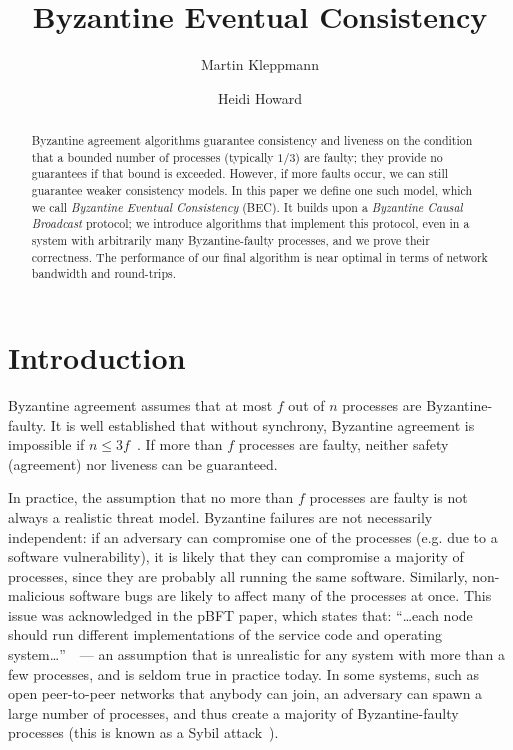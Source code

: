 \documentclass[a4paper,anonymous,USenglish]{lipics-v2019}
\title{Byzantine Eventual Consistency}
\author{Martin Kleppmann}{University of Cambridge}{mk428@cst.cam.ac.uk}{https://orcid.org/0000-0001-7252-6958}{Supported by a Leverhulme Trust Early Career Fellowship and by the Isaac Newton Trust.}
\author{Heidi Howard}{University of Cambridge}{hh360@cst.cam.ac.uk}{https://orcid.org/0000-0001-5256-7664}{}
\begin{document}
\maketitle
\begin{abstract}
    Byzantine agreement algorithms guarantee consistency and liveness on the condition that a bounded number of processes (typically $1/3$) are faulty; they provide no guarantees if that bound is exceeded.
    However, if more faults occur, we can still guarantee weaker consistency models. 
    In this paper we define one such model, which we call \emph{Byzantine Eventual Consistency} (BEC).
    It builds upon a \emph{Byzantine Causal Broadcast} protocol; we introduce algorithms that implement this protocol, even in a system with arbitrarily many Byzantine-faulty processes, and we prove their correctness.
    The performance of our final algorithm is near optimal in terms of network bandwidth and round-trips.
\end{abstract}
\maketitle

\section{Introduction}

Byzantine agreement assumes that at most $f$ out of $n$ processes are Byzantine-faulty.
It is well established that without synchrony, Byzantine agreement is impossible if $n\leq3f$~\cite{Dwork:1988,Lamport:1982}.
If more than $f$ processes are faulty, neither safety (agreement) nor liveness can be guaranteed.

In practice, the assumption that no more than $f$ processes are faulty is not always a realistic threat model.
Byzantine failures are not necessarily independent: if an adversary can compromise one of the processes (e.g. due to a software vulnerability), it is likely that they can compromise a majority of processes, since they are probably all running the same software. 
Similarly, non-malicious software bugs are likely to affect many of the processes at once.
This issue was acknowledged in the pBFT paper, which states that: ``{\dots}each node should run different implementations of the service code and operating system{\dots}''~\cite{Castro:1999}~--- an assumption that is unrealistic for any system with more than a few processes, and is seldom true in practice today.
In some systems, such as open peer-to-peer networks that anybody can join, an adversary can spawn a large number of processes, and thus create a majority of Byzantine-faulty processes (this is known as a Sybil attack~\cite{Douceur:2002}).
\end{document}
